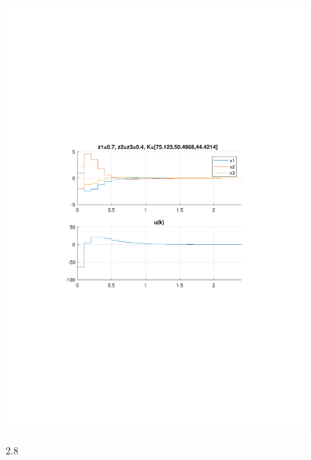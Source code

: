 \documentclass{article}
\begin{document}
{\begin{figure}[H]
\includegraphics[clip, trim=0.5cm 9.5cm 0.5cm 9.5cm, width=1.00\textwidth]{../rys/zad3b_rys8.pdf}
\label{fig:rys3.2.8}
\caption{2.8}
\end{figure}
}
\end{document}
